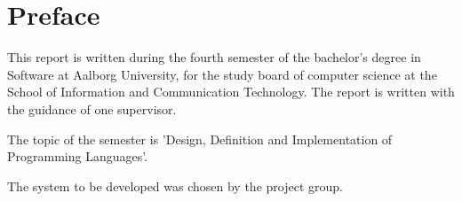 \chapter*{Preface}
This report is written during the fourth semester of the bachelor's degree in Software at Aalborg University, for the study board of computer science at the School of Information and Communication Technology.
The report is written with the guidance of one supervisor.

The topic of the semester is 'Design, Definition and Implementation of Programming Languages'.

The system to be developed was chosen by the project group.



\newpage